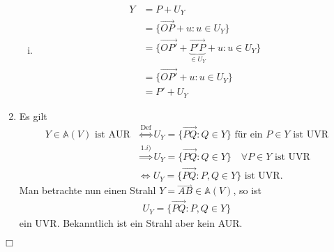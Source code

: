 \documentclass[11pt]{article}
\newcommand{\ray}[1]{\stackrel{\rightharpoonup}{#1}}
\begin{document}
\begin{enumerate}[1)]
\begin{enumerate}[i)]
		\item 
		\begin{equation*}
		\begin{aligned}
		Y &= P + U_Y\\
		&= \lbrace \overrightarrow{OP} + u : u \in U_Y \rbrace\\
		&= \lbrace \overrightarrow{OP'} + \underbrace{\overrightarrow{P'P}}_{\in U_Y} + u : u \in U_Y \rbrace \\
		&= \lbrace \overrightarrow{OP'} + u : u \in U_Y \rbrace\\
		&= P' + U_Y
		\end{aligned}
		\end{equation*}
	\end{enumerate}
\item Es gilt
\begin{equation*}
\begin{aligned}
Y \in \mathbb{A}(V) \text{ ist AUR} &\stackrel{\mathrm{Def}}{\Leftrightarrow} U_Y = \lbrace \overrightarrow{PQ} : Q\in Y \rbrace \text{ für ein } P \in Y \text{ ist UVR}\\
&\stackrel{1.i)}{\Rightarrow} U_Y = \lbrace \overrightarrow{PQ} : Q\in Y \rbrace \quad \forall P \in Y \text{ ist UVR}\\
&\stackrel{}{\Leftrightarrow} U_Y = \lbrace \overrightarrow{PQ} : P,Q\in Y \rbrace \text{ ist UVR}.
\end{aligned}
\end{equation*}
Man betrachte nun einen Strahl $ Y = \ray{AB} \in \mathbb{A}(V) $, so ist
\begin{equation*}
\begin{aligned}
U_Y = \lbrace \overrightarrow{PQ} : P,Q\in Y \rbrace
\end{aligned}
\end{equation*}
ein UVR. Bekanntlich ist ein Strahl aber kein AUR.
\end{enumerate}
\begin{flushright}
	$ \Box $
\end{flushright}
\newpage
\end{document}

